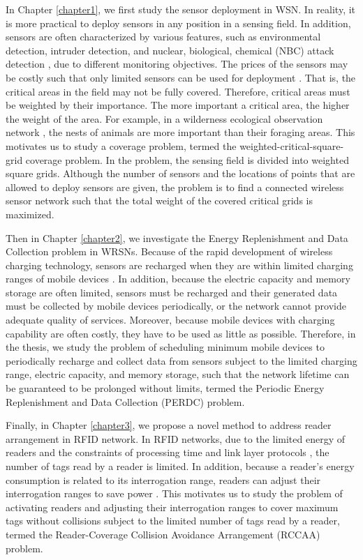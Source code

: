In Chapter \ref{chapter1}, we first study the sensor deployment in WSN.
In reality, it is more practical to deploy sensors in
any position in a sensing field. In addition, sensors are often
characterized by various features, such as environmental detection,
intruder detection, and nuclear, biological, chemical (NBC) attack
detection \cite{greenorb, 5235625, intrusion}, due to different monitoring
objectives. The prices of the sensors may be costly such that only
limited sensors can be used for deployment
\cite{5718179,6129271,6095622}. That is, the critical areas in the
field may not be fully covered. Therefore, critical areas must be
weighted by their importance. The more important a critical area,
the higher the weight of the area. For example, in a wilderness
ecological observation network \cite{5719526,COBI:COBI676}, the
nests of animals are more important than their foraging areas. This
motivates us to study a coverage problem, termed the
weighted-critical-square-grid coverage problem. In the problem, the
sensing field is divided into weighted square grids. Although the
number of sensors and the locations of points that are allowed to
deploy sensors are given, the problem is to find a connected
wireless sensor network such that the total weight of the covered
critical grids is maximized.

Then in Chapter \ref{chapter2}, we investigate the Energy Replenishment
and Data Collection problem in WRSNs.
Because of the rapid development of wireless charging technology,
sensors are recharged when they are within limited charging ranges
of mobile devices \cite{INFOCOM6,IEEE7,IEEE12,IEEE17}. In addition,
because the electric capacity and memory storage
\cite{IEEE23,IEEE24} are often limited, sensors must be recharged
and their generated data must be collected by mobile devices
periodically, or the network cannot provide adequate quality of
services. Moreover, because mobile devices with charging capability
are often costly, they have to be used as little as possible.
Therefore, in the thesis, we study the problem of scheduling minimum mobile
devices to periodically recharge and collect data from sensors
subject to the limited charging range, electric capacity, and memory
storage, such that the network lifetime can be guaranteed to be
prolonged without limits, termed the Periodic Energy Replenishment
and Data Collection (PERDC) problem.

Finally, in Chapter \ref{chapter3}, we propose a novel method to
address reader arrangement in RFID network. In RFID networks,
due to the limited energy of readers and the
constraints of processing time and link layer protocols
\cite{related1,related2}, the number of tags read by a reader is
limited. In addition, because a reader's energy consumption is
related to its interrogation range, readers can adjust their
interrogation ranges to save power \cite{WadaHFMO12,4654237}. This
motivates us to study the problem of activating readers and
adjusting their interrogation ranges to cover maximum tags without
collisions subject to the limited number of tags read by a reader,
termed the Reader-Coverage Collision Avoidance Arrangement (RCCAA)
problem.

